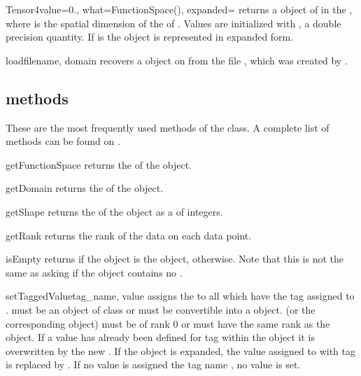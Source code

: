 \begin{funcdesc}{Tensor4}{value=0., what=FunctionSpace(), expanded=\False}
returns a \Data object of \Shape {} in the \FunctionSpace {},
where  is the spatial dimension of the \Domain of .
Values are initialized with , a double precision quantity.
If  is \True the \Data object is represented in expanded form.
\end{funcdesc}

\begin{funcdesc}{load}{filename, domain}
recovers a \Data object on \Domain {} from the file ,
which was created by .
\end{funcdesc}

\subsection{\Data methods}
These are the most frequently used methods of the \Data class.
A complete list of methods can be found on \ReferenceGuide.

\begin{methoddesc}[Data]{getFunctionSpace}{}
returns the \FunctionSpace of the object.
\end{methoddesc}

\begin{methoddesc}[Data]{getDomain}{}
returns the \Domain of the object.
\end{methoddesc}

\begin{methoddesc}[Data]{getShape}{}
returns the \Shape of the object as a  of integers.
\end{methoddesc}

\begin{methoddesc}[Data]{getRank}{}
returns the rank of the data on each data point.
\end{methoddesc}

\begin{methoddesc}[Data]{isEmpty}{}
returns \True if the \Data object is the \EmptyData object, \False otherwise.
Note that this is not the same as asking if the object contains no \DataSamplePoints.
\end{methoddesc}

\begin{methoddesc}[Data]{setTaggedValue}{tag_name, value}
assigns the  to all \DataSamplePoints which have the tag
assigned to .  must be an object of class
 or must be convertible into a  object.
 (or the corresponding  object) must be of
rank $0$ or must have the same rank as the object.
If a value has already been defined for tag  within the object
it is overwritten by the new . If the object is expanded,
the value assigned to \DataSamplePoints with tag  is replaced by
. If no value is assigned the tag name , no value is set.
\end{methoddesc}

